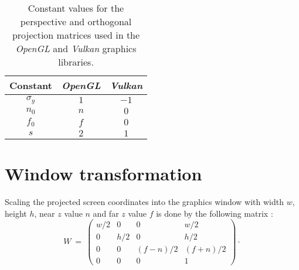 \begin{table}[htb]
	\centering
	\begin{tabular}{|c|cc|}
		\hline
		    Constant &  \textit{OpenGL} &   \textit{Vulkan} \tabularnewline
		\hline
		  $\sigma_y$ &              $1$ &              $-1$ \tabularnewline
		       $n_0$ &              $n$ &               $0$ \tabularnewline
		       $f_0$ &              $f$ &               $0$ \tabularnewline
		         $s$ &              $2$ &               $1$ \tabularnewline
		\hline
	\end{tabular}
	\caption[Projection matrix constants]{
		Constant values for the perspective and orthogonal projection matrices used in the
		\textit{OpenGL} \cite{web_OpenGL} and \textit{Vulkan} \cite{web_Vulkan} graphics libraries.}
	\label{tab:gl_constants}
\end{table}



\section{Window transformation}
\label{sec:gl_viewport}
Scaling the projected screen coordinates into the graphics window with width $w$, height $h$, near
$z$ value $n$ and far $z$ value $f$ is done by the following matrix \cite{web_gl_viewport}:
\begin{equation}
	W \ =\ 
	\left( \begin{array}{cccc} 
		w/2 &   0 &                  0 &                w/2 \\
		  0 & h/2 &                  0 &                h/2 \\
		  0 &   0 & \left(f-n\right)/2 & \left(f+n\right)/2 \\
		  0 &   0 &                  0 &                  1
	\end{array} \right) \cdot
\end{equation}



